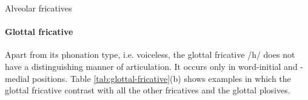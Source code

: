 \begin{table}[!htb]
\centering
\caption{Alveolar  fricatives\label{tab:alveolar-fricatives}}

\quad
{}


\end{table}






\paragraph{Glottal fricative}
Apart from its phonation type, i.e. voiceless, the glottal fricative  /h/  does
not have a distinguishing manner of articulation.  It
occurs only in word-initial and -medial positions.
Table \ref{tab:glottal-fricative}(b) shows examples in which the glottal
fricative
contrast with all the other fricatives and the glottal plosives.


